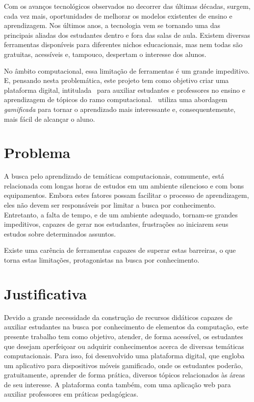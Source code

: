 Com os avanços tecnológicos observados no decorrer das últimas décadas, surgem, cada vez mais, oportunidades de melhorar os modelos existentes de ensino e aprendizagem. Nos últimos anos, a tecnologia vem se tornando uma das principais aliadas dos estudantes dentro e fora das salas de aula. Existem diversas ferramentas disponíveis para diferentes nichos educacionais, mas nem todas são gratuitas, acessíveis e, tampouco, despertam o interesse dos alunos.

No âmbito computacional, essa limitação de ferramentas é um grande impeditivo. E, pensando nesta problemática, este projeto tem como objetivo criar uma plataforma digital, intitulada \appName\, para auxiliar estudantes e professores no ensino e aprendizagem de tópicos do ramo computacional. \appName\ utiliza uma abordagem \textit{gamificada} para tornar o aprendizado mais interessante e, consequentemente, mais fácil de alcançar o aluno.

\section{Problema}
A busca pelo aprendizado de temáticas computacionais, comumente, está relacionada com longas horas de estudos em um ambiente silencioso e com bons equipamentos. Embora estes fatores possam facilitar o processo de aprendizagem, eles não devem ser responsáveis por limitar a busca por conhecimento. Entretanto, a falta de tempo, e de um ambiente adequado, tornam-se grandes impeditivos, capazes de gerar nos estudantes, frustrações ao iniciarem seus estudos sobre determinados assuntos.

Existe uma carência de ferramentas capazes de superar estas barreiras, o que torna estas limitações, protagonistas na busca por conhecimento.

\section{Justificativa}
Devido a grande necessidade da construção de recursos didáticos capazes de auxiliar estudantes na busca por conhecimento de elementos da computação, este presente trabalho tem como objetivo, atender, de forma acessível, os estudantes que desejam aperfeiçoar ou adquirir conhecimentos acerca de diversas temáticas computacionais. Para isso, foi desenvolvido uma plataforma digital, que engloba um aplicativo para dispositivos móveis gamificado, onde os estudantes poderão, gratuitamente, aprender de forma prática, diversos tópicos relacionados às áreas de seu interesse. A plataforma conta também, com uma aplicação web para auxiliar professores em práticas pedagógicas.

